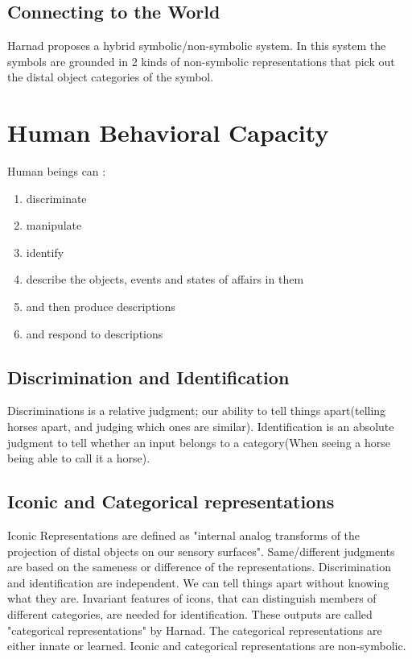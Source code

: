 \documentclass{article}
\begin{document}
	\subsection{Connecting to the World}
	Harnad proposes a hybrid symbolic/non-symbolic system. In this system the symbols are grounded in 2 kinds of non-symbolic representations that pick out the distal object categories of the symbol.
	\section{Human Behavioral Capacity}
	Human beings can :
	\begin{enumerate}
		\item discriminate
		\item manipulate
		\item identify
		\item describe the objects, events and states of affairs in them
		\item and then produce descriptions
		\item and respond to descriptions
	\end{enumerate}
	\subsection{Discrimination and Identification}
	Discriminations is a relative judgment; our ability to tell things apart(telling horses apart, and judging which ones are similar). Identification is an absolute judgment to tell whether an input belongs to a category(When seeing a horse being able to call it a horse).
	\subsection{Iconic and Categorical representations}
	Iconic Representations are defined as "internal analog transforms of the projection of distal objects on our sensory surfaces". Same/different judgments are based on the sameness or difference of the representations. Discrimination and identification are independent. We can tell things apart without knowing what they are. Invariant features of icons, that can distinguish members of different categories, are needed for identification.
	These outputs are called "categorical representations" by Harnad. The categorical representations are either innate or learned. Iconic and categorical representations are non-symbolic. 
\end{document}
